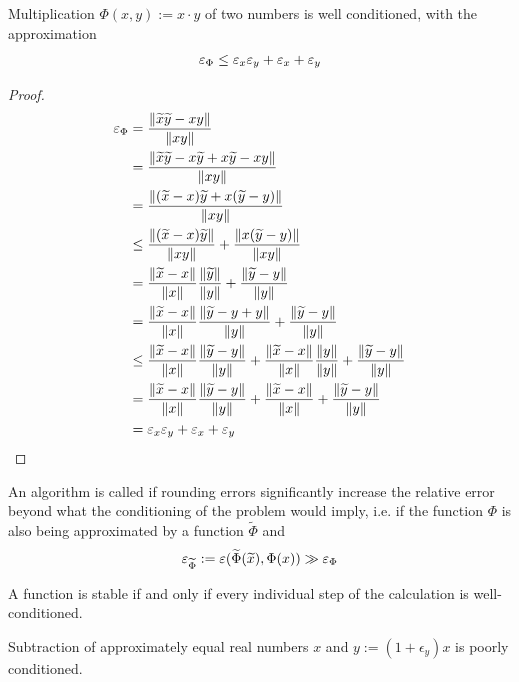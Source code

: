 \begin{lemma}
	Multiplication $\Phi(x,y) := x \cdot y$ of two numbers is well conditioned, with the approximation
	\begin{align*}
		\varepsilon_\Phi \leq \varepsilon_x\varepsilon_y + \varepsilon_x + \varepsilon_y
	\end{align*}
\end{lemma}
\begin{proof}
	\begin{align*}
		\varepsilon_\Phi
		&=
		\frac{\norm{\widetilde x\widetilde y - xy}}{\norm{xy}}\\
		&=
		\frac{\norm{\widetilde x\widetilde y - x\widetilde y + x\widetilde y - xy}}{\norm{xy}}\\
		&=
		\frac{\norm{(\widetilde x - x)\widetilde y + x(\widetilde y - y)}}{\norm{xy}}\\
		&\leq
		\frac{\norm{(\widetilde x - x)\widetilde y}}{\norm{xy}} 
		+ 
		\frac{\norm{x(\widetilde y - y)}}{\norm{xy}}\\
		&=
		\frac{\norm{\widetilde x - x}}{\norm{x}}\frac{\norm{\widetilde y}}{\norm{y}}
		+ 
		\frac{\norm{\widetilde y - y}}{\norm{y}}\\
		&=
		\frac{\norm{\widetilde x - x}}{\norm{x}}\frac{\norm{\widetilde y - y + y}}{\norm{y}}
		+ 
		\frac{\norm{\widetilde y - y}}{\norm{y}}\\
		&\leq
		\frac{\norm{\widetilde x - x}}{\norm{x}}\frac{\norm{\widetilde y - y}}{\norm{y}}
		+
		\frac{\norm{\widetilde x - x}}{\norm{x}}
		\frac{\norm{y}}{\norm{y}}
		+ 
		\frac{\norm{\widetilde y - y}}{\norm{y}}\\
		&=
		\frac{\norm{\widetilde x - x}}{\norm{x}}\frac{\norm{\widetilde y - y}}{\norm{y}}
		+
		\frac{\norm{\widetilde x - x}}{\norm{x}}
		+ 
		\frac{\norm{\widetilde y - y}}{\norm{y}}\\
		&=
		\varepsilon_x\varepsilon_y + \varepsilon_x + \varepsilon_y
	\end{align*}
\end{proof}
\begin{definition}
	An algorithm is called  if rounding errors significantly increase the relative error beyond what the conditioning of the problem would imply, i.e. if the function $\Phi$ is also being approximated by a function $\tilde \Phi$ and
	\begin{align*}
		\varepsilon_{\widetilde \Phi} := \varepsilon(\widetilde \Phi(\widetilde x), \Phi(x))
		\gg \varepsilon_\Phi	
	\end{align*}
\end{definition}
A function is stable if and only if every individual step of the calculation is well-conditioned.
\begin{theorem}
	Subtraction of approximately equal real numbers $x$ and $y := (1+\epsilon_y)x$ is poorly conditioned.
\end{theorem}
